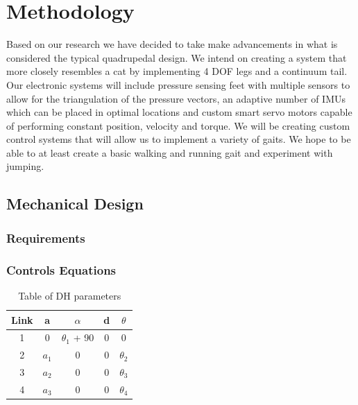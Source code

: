 \section{Methodology}
Based on our research we have decided to take make advancements in what is considered the typical quadrupedal design. We intend on creating a system that more closely resembles a cat by implementing 4 DOF legs and a continuum tail. Our electronic systems will include pressure sensing feet with multiple sensors to allow for the triangulation of the pressure vectors, an adaptive number of IMUs which can be placed in optimal locations and custom smart servo motors capable of performing constant position, velocity and torque. We will be creating custom control systems that will allow us to implement a variety of gaits. We hope to be able to at least create a basic walking and running gait and experiment with jumping.

\subsection{Mechanical Design} %
    \subsubsection{Requirements} %
     \subsubsection{Controls Equations}
     \begin{table}[H]
        \centering
        \begin{tabular}{|c|c|c|c|c|}
        \hline
            Link & a & $\alpha$ & d & $\theta$ \\
            \hline
            1 & 0 & $\theta_1$ + 90& 0& 0\\
            2 & $a_1$ & 0 & 0 &$\theta_2$ \\
            3 & $a_2$ & 0 & 0 &$\theta_3$ \\
            4 & $a_3$ & 0 & 0 &$\theta_4$ \\
            \hline
            \end{tabular}
        \caption{Table of DH parameters}
        \label{tab:DHTable}
    \end{table}
    
